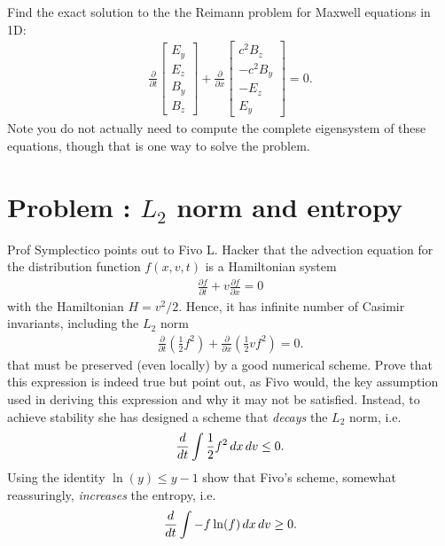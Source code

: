 \documentclass[11pt]{article}
\newcommand{\pfrac}[2]{\frac{\partial #1}{\partial #2}}
\newcommand{\pfraca}[1]{\frac{\partial}{\partial #1}}
\newcounter{probnum}
\begin{document}
Find the exact solution to the the Reimann problem for Maxwell
equations in 1D:
\begin{align*}
  \frac{\partial }{\partial t}
  \left[
    \begin{matrix}
      E_y \\
      E_z \\
      B_y \\
      B_z
    \end{matrix}
  \right]
  +
  \frac{\partial }{\partial x}
  \left[
    \begin{matrix}
      c^2B_z \\
      -c^2B_y \\
      -E_z \\
      E_y
    \end{matrix}
  \right]
  =
  0.
\end{align*}
Note you do not actually need to compute the complete eigensystem of
these equations, though that is one way to solve the problem.

\section*{Problem : $L_2$ norm and entropy}

Prof Symplectico points out to Fivo L. Hacker that the advection
equation for the distribution function $f(x,v,t)$ is a Hamiltonian
system
\begin{align*}
  \pfrac{f}{t} + v\pfrac{f}{x} = 0
\end{align*}
with the Hamiltonian $H = v^2/2$. Hence, it has infinite number of
Casimir invariants, including the $L_2$  norm
\begin{align*}
  \pfraca{t}\left(\frac{1}{2} f^2\right) + \pfraca{x}\left( \frac{1}{2} v f^2 \right) = 0.
\end{align*}
that must be preserved (even locally) by a good numerical
scheme. Prove that this expression is indeed true but point out, as
Fivo would, the key assumption used in deriving this expression and
why it may not be satisfied. Instead, to achieve stability she has
designed a scheme that \emph{decays} the $L_2$ norm, i.e.
\begin{align*}
  \frac{d}{dt}\int \frac{1}{2} f^2\thinspace dx\thinspace dv  \le 0.
\end{align*}
Using the identity $\ln(y) \le y-1$ show that Fivo's scheme, somewhat
reassuringly, \emph{increases} the entropy, i.e.
\begin{align*}
  \frac{d}{dt}\int -f \ln(f) \thinspace dx\thinspace dv  \ge 0.
\end{align*}
\end{document}
